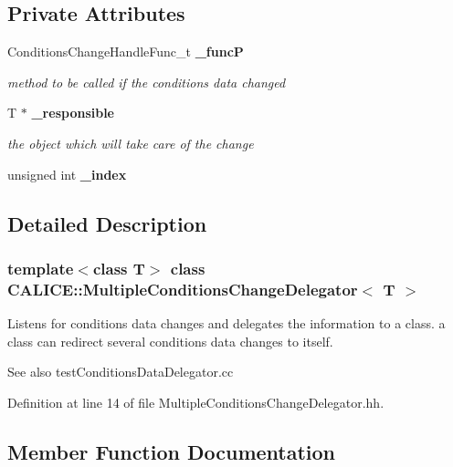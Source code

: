 \subsection*{Private Attributes}
\begin{DoxyCompactItemize}
\item 
ConditionsChangeHandleFunc\_\-t {\bf \_\-funcP}\label{classCALICE_1_1MultipleConditionsChangeDelegator_a4a645a8a5db35c8c8841a770c0a64188}

\begin{DoxyCompactList}\small\item\em method to be called if the conditions data changed \item\end{DoxyCompactList}\item 
T $\ast$ {\bf \_\-responsible}\label{classCALICE_1_1MultipleConditionsChangeDelegator_a64d4deb6c673f64dfe2c1be72543714a}

\begin{DoxyCompactList}\small\item\em the object which will take care of the change \item\end{DoxyCompactList}\item 
unsigned int {\bfseries \_\-index}\label{classCALICE_1_1MultipleConditionsChangeDelegator_a3a49a4d76e2e0f374b4c526339ac970b}

\end{DoxyCompactItemize}


\subsection{Detailed Description}
\subsubsection*{template$<$class T$>$ class CALICE::MultipleConditionsChangeDelegator$<$ T $>$}

Listens for conditions data changes and delegates the information to a class. a class can redirect several conditions data changes to itself. \begin{DoxySeeAlso}{See also}
testConditionsDataDelegator.cc 
\end{DoxySeeAlso}


Definition at line 14 of file MultipleConditionsChangeDelegator.hh.

\subsection{Member Function Documentation}
